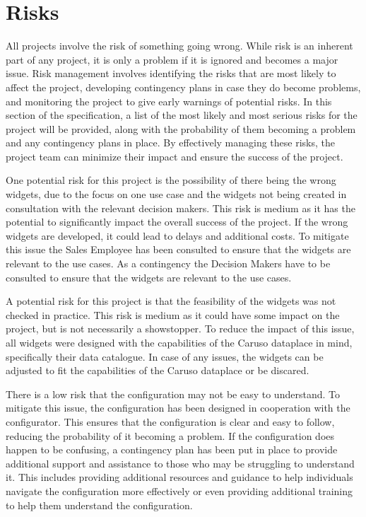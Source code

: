 \chapter{Risks}

All projects involve the risk of something going wrong. While risk is an inherent part of any project, it is only a problem if it is ignored and becomes a major issue. Risk management involves identifying the risks that are most likely to affect the project, developing contingency plans in case they do become problems, and monitoring the project to give early warnings of potential risks. In this section of the specification, a list of the most likely and most serious risks for the project will be provided, along with the probability of them becoming a problem and any contingency plans in place. By effectively managing these risks, the project team can minimize their impact and ensure the success of the project.

One potential risk for this project is the possibility of there being the wrong widgets, due to the focus on one use case and the widgets not being created in consultation with the relevant decision makers. This risk is medium as it has the potential to significantly impact the overall success of the project. If the wrong widgets are developed, it could lead to delays and additional costs. To mitigate this issue the Sales Employee has been consulted to ensure that the widgets are relevant to the use cases. As a contingency the Decision Makers have to be consulted to ensure that the widgets are relevant to the use cases.

A potential risk for this project is that the feasibility of the widgets was not checked in practice. This risk is medium as it could have some impact on the project, but is not necessarily a showstopper. To reduce the impact of this issue, all widgets were designed with the capabilities of the Caruso dataplace in mind, specifically their data catalogue. In case of any issues, the widgets can be adjusted to fit the capabilities of the Caruso dataplace or be discared.

There is a low risk that the configuration may not be easy to understand. To mitigate this issue, the configuration has been designed in cooperation with the configurator. This ensures that the configuration is clear and easy to follow, reducing the probability of it becoming a problem. If the configuration does happen to be confusing, a contingency plan has been put in place to provide additional support and assistance to those who may be struggling to understand it. This includes providing additional resources and guidance to help individuals navigate the configuration more effectively or even providing additional training to help them understand the configuration.

